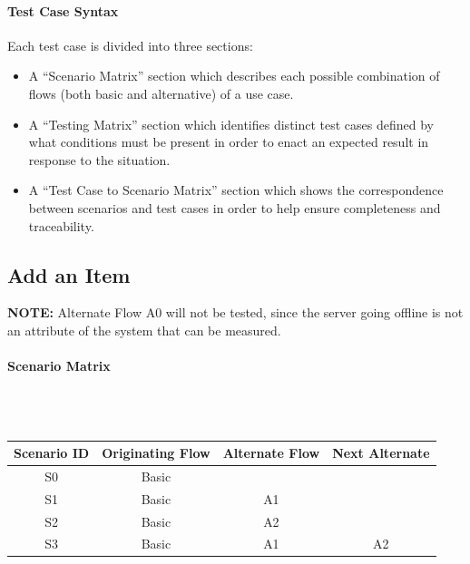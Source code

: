 \documentclass{article}
\begin{document}
\paragraph{Test Case Syntax}
Each test case is divided into three sections:
\begin{itemize}
\item A ``Scenario Matrix'' section which describes each possible combination of flows (both basic and alternative) of a use case.
\item A ``Testing Matrix'' section which identifies distinct test cases defined by what conditions must be present in order to enact an expected result in response to the situation.
\item A ``Test Case to Scenario Matrix'' section which shows the correspondence between scenarios and test cases in order to help ensure completeness and traceability.
\end{itemize}

\subsection{Add an Item}
\textbf{NOTE:} Alternate Flow A0 will not be tested, since the server going offline is not an attribute of the system that can be measured.\label{flow}

\paragraph{Scenario Matrix}~\\ \\
\begin{tabular}{ c  c  c  c }
\hline
Scenario ID & Originating Flow & Alternate Flow & Next Alternate\label{scenario}\\
\hline
\hline
S0 & Basic &  & \\
\hline
S1 & Basic & A1 & \\
\hline
S2 & Basic & A2 & \\
\hline
S3 & Basic & A1 & A2\\
\hline
\end{tabular}\\
~\\
~\\
\end{document}
